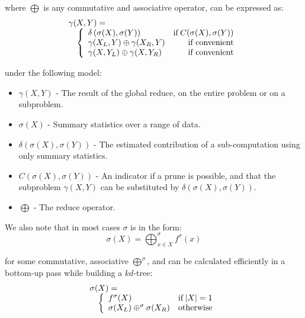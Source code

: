 \documentclass[times, 10pt,twocolumn]{article}
\DeclareMathOperator{\IF}{if}
\newcommand{\allsigma}{\sigma}
\begin{document}
\noindent where $\bigoplus$ is any commutative and associative operator, can be expressed as:
\begin{equation}
\label{eqn:global_intrinsic}
 \begin{array}{ll}
  \lefteqn{\gamma(X, Y) =}
  \\
  & \left\{
    \begin{array}{lr}
      \delta \left( \allsigma(X), \allsigma(Y) \right) & \IF C(\allsigma(X), \allsigma(Y))
      \\
      \gamma(X_L, Y) \oplus \gamma(X_R, Y) & \mbox{if convenient}
      \\
      \gamma(X, Y_L) \oplus  \gamma(X, Y_R) & \mbox{if convenient}
    \end{array}
  \right.
 \end{array}
\end{equation}

\noindent under the following model:
\begin{itemize}
  \item $\gamma(X, Y)$ - The result of the global reduce, on the entire problem or on a subproblem.
  \item $\allsigma(X)$ - Summary statistics over a range of data.
  \item $\delta(\allsigma(X), \allsigma(Y))$ - The estimated contribution of a sub-computation using only summary statistics.
  \item $C(\allsigma(X), \allsigma(Y))$ - An indicator if a prune is possible, and that the subproblem $\gamma(X, Y)$ can be substituted by $\delta(\allsigma(X), \allsigma(Y))$.
  \item $\bigoplus$ - The reduce operator.
\end{itemize}

\noindent We also note that in most cases $\allsigma$ is in the form:
\begin{equation}
  \allsigma(X) = \bigoplus^{\allsigma}_{x \in X} f^{\allsigma}(x)
\end{equation}

\noindent for some commutative, associative $\bigoplus^{\allsigma}$, and can be calculated efficiently in a bottom-up pass while building a $kd$-tree:
\begin{equation}
\label{eqn:sigma}
 \begin{array}{ll}
  \lefteqn{\allsigma(X) =}
  \\
  & \left\{
    \begin{array}{lr}
      f^{\allsigma}(X) & \IF |X| = 1
      \\
      \allsigma(X_L) \oplus^{\allsigma} \allsigma(X_R) & \mbox{otherwise}
    \end{array}
  \right.
 \end{array}
\end{equation}
\end{document}
